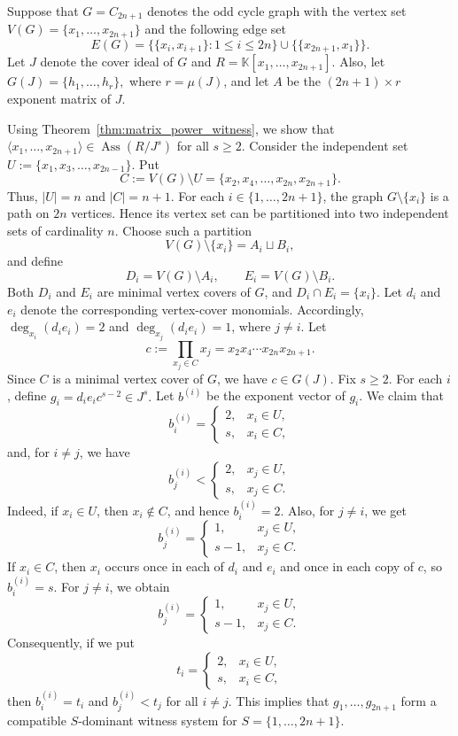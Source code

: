 \documentclass[11pt]{amsart}   %
\begin{document}

\begin{exm} \label{Example-1}
Suppose that  $G=C_{2n+1}$ denotes  the odd  cycle graph with the vertex set  $V(G)=\{x_1,\ldots,x_{2n+1}\}$  and the following  edge set
\[
E(G)=
\big\{\{x_i,x_{i+1}\}:1\leq i\leq 2n\big\}
\cup
\big\{\{x_{2n+1},x_1\}\big\}.
\]
Let $J$ denote the cover ideal of $G$ and $R=\mathbb K[x_1, \ldots, x_{2n+1}]$.  Also, let
$
G(J)=\{h_1,\ldots,h_r\},
$
where $r=\mu(J)$, and let $A$ be the $(2n+1)\times r$ exponent matrix of $J$.

 Using Theorem~\ref{thm:matrix_power_witness}, we show that
  $\langle x_1,\ldots,x_{2n+1}\rangle\in\operatorname{Ass}(R/J^s)$ for all $s\geq 2$.  Consider the independent set
 $U:=\{x_1,x_3,\ldots,x_{2n-1}\}.$  Put
\[
C:=V(G)\setminus U
=\{x_2,x_4,\ldots,x_{2n},x_{2n+1}\}.
\]
Thus, $|U|=n$ and $|C|=n+1$. For each $i\in\{1,\ldots,2n+1\}$, the graph $G\setminus\{x_i\}$ is a path on $2n$ vertices. Hence its vertex set
can be partitioned into two independent sets of cardinality $n$. Choose such a partition
\[
V(G)\setminus\{x_i\}=A_i\sqcup B_i,
\]
and define
\[
D_i=V(G)\setminus A_i,
\qquad
E_i=V(G)\setminus B_i.
\]
Both $D_i$ and $E_i$ are minimal vertex covers of $G$, and $D_i\cap E_i=\{x_i\}.$
Let $d_i$ and $e_i$ denote the corresponding vertex-cover monomials.
Accordingly,  $\deg_{x_i}(d_ie_i)=2$ and $\deg_{x_j}(d_ie_i)=1$, where $j\neq i$.  Let
\[
c:=\prod_{x_j\in C}x_j
=x_2x_4\cdots x_{2n}x_{2n+1}.
\]
Since $C$ is a minimal vertex cover of $G$, we have $c\in G(J)$.
Fix $s\geq2$. For each $i$, define $g_i=d_ie_i c^{s-2}\in J^s.$
Let $b^{(i)}$ be the exponent vector of $g_i$. We claim that
\[
b^{(i)}_i=
\begin{cases}
2,&x_i\in U,\\[2mm]
s,&x_i\in C,
\end{cases}
\]
and, for $i\neq j$, we have
\[
b^{(i)}_j<
\begin{cases}
2,&x_j\in U,\\[2mm]
s,&x_j\in C.
\end{cases}
\]
Indeed, if $x_i\in U$, then $x_i\notin C$, and hence $b^{(i)}_i=2.$ Also, for $j\neq i$, we get
\[
b^{(i)}_j=
\begin{cases}
1,&x_j\in U,\\
s-1,&x_j\in C.
\end{cases}
\]
If $x_i\in C$, then $x_i$ occurs once in each of $d_i$ and $e_i$
and once in each copy of $c$, so $b^{(i)}_i=s.$ For $j\neq i$, we obtain
\[
b^{(i)}_j=
\begin{cases}
1,&x_j\in U,\\
s-1,&x_j\in C.
\end{cases}
\]
Consequently, if we put
\[
t_i=
\begin{cases}
2,&x_i\in U,\\[2mm]
s,&x_i\in C,
\end{cases}
\]
then $b^{(i)}_i=t_i$ and $b^{(i)}_j<t_j$ for all $i\neq j.$ This implies that $g_1,\ldots,g_{2n+1}$
form a compatible $S$-dominant witness system for $S=\{1,\ldots,2n+1\}.$


\end{exm}
\end{document}
